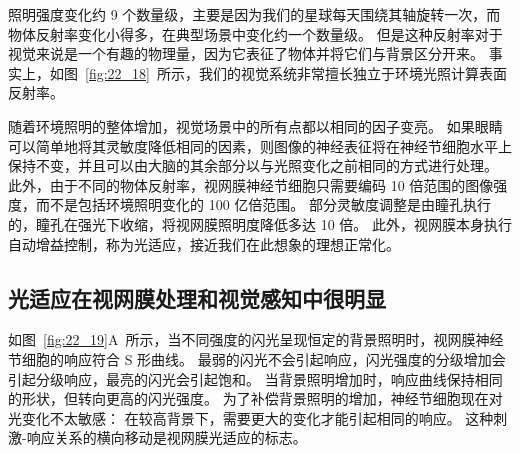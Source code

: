 照明强度变化约 9 个数量级，主要是因为我们的星球每天围绕其轴旋转一次，而物体反射率变化小得多，在典型场景中变化约一个数量级。
但是这种反射率对于视觉来说是一个有趣的物理量，因为它表征了物体并将它们与背景区分开来。
事实上，如图~\ref{fig:22_18}~所示，我们的视觉系统非常擅长独立于环境光照计算表面反射率。


随着环境照明的整体增加，视觉场景中的所有点都以相同的因子变亮。
如果眼睛可以简单地将其灵敏度降低相同的因素，则图像的神经表征将在神经节细胞水平上保持不变，并且可以由大脑的其余部分以与光照变化之前相同的方式进行处理。 
此外，由于不同的物体反射率，视网膜神经节细胞只需要编码 10 倍范围的图像强度，而不是包括环境照明变化的 100 亿倍范围。
部分灵敏度调整是由瞳孔执行的，瞳孔在强光下收缩，将视网膜照明度降低多达 10 倍。
此外，视网膜本身执行自动增益控制，称为光适应，接近我们在此想象的理想正常化。



\subsection{光适应在视网膜处理和视觉感知中很明显}

如图~\ref{fig:22_19}A~所示，当不同强度的闪光呈现恒定的背景照明时，视网膜神经节细胞的响应符合 S 形曲线。
最弱的闪光不会引起响应，闪光强度的分级增加会引起分级响应，最亮的闪光会引起饱和。
当背景照明增加时，响应曲线保持相同的形状，但转向更高的闪光强度。
为了补偿背景照明的增加，神经节细胞现在对光变化不太敏感：
在较高背景下，需要更大的变化才能引起相同的响应。
这种刺激-响应关系的横向移动是视网膜光适应的标志。


